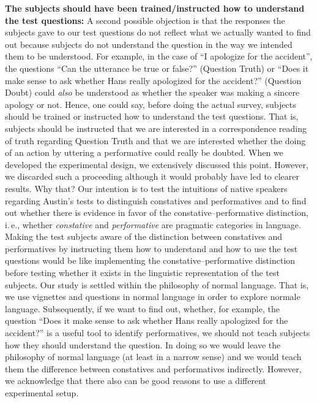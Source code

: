\documentclass[egregdoesnotlikesansseriftitles,12pt]{scrartcl}
\begin{document}
\noindent\textbf{The subjects should have been trained/instructed how to understand the test questions:} A second possible objection is that the responses the subjects gave to our test questions do not reflect what we actually wanted to find out because subjects do not understand the question in the way we intended them to be understood. For example, in the case of ``I apologize for the accident'', the questions ``Can the utterance be true or false?'' (Question Truth) or ``Does it make sense to ask whether Hans really apologized for the accident?'' (Question Doubt) could \textit{also} be understood as whether the speaker was making a sincere apology or not. Hence, one could say, before doing the actual survey, subjects should be trained or instructed how to understand the test questions. That is, subjects should be instructed that we are interested in a correspondence reading of truth regarding Question Truth and that we are interested whether the doing of an action by uttering a performative could really be doubted. When we developed the experimental design, we extensively discussed this point. However, we discarded such a proceeding although it would probably have led to clearer results. Why that? Our intention is to test the intuitions of native speakers regarding Austin's tests to distinguish constatives and performatives and to find out whether there is evidence in favor of the constative--performative distinction, i.\,e., whether \textit{constative} and \textit{performative} are pragmatic categories in language. Making the test subjects aware of the distinction between constatives and performatives by instructing them how to understand and how to use the test questions would be like implementing the constative--performative distinction before testing whether it exists in the linguistic representation of the test subjects. Our study is settled within the philosophy of normal language. That is, we use vignettes and questions in normal language in order to explore normale language. Subsequently, if we want to find out, whether, for example, the question ``Does it make sense to ask whether Hans really apologized for the accident?'' is a useful tool to identify performatives, we should not teach subjects how they should understand the question. In doing so we would leave the philosophy of normal language (at least in a narrow sense) and we would teach them the difference between constatives and performatives indirectly. However, we acknowledge that there also can be good reasons to use a different experimental setup.\\ 
\end{document}
